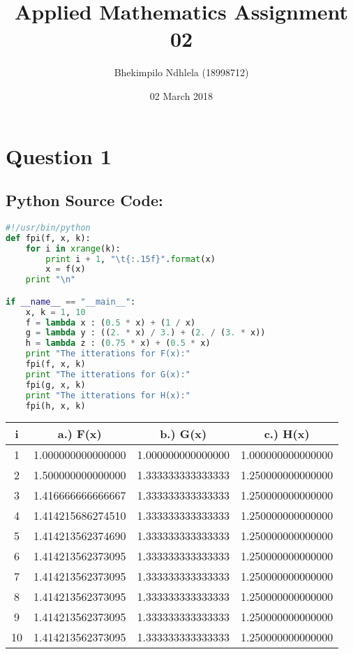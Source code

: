 \documentclass{article}
\title{Applied Mathematics Assignment 02}
\author{Bhekimpilo Ndhlela (18998712)}
\date{02 March 2018}
\begin{document}
\maketitle
\pagebreak
\section*{Question 1}
\subsection*{Python Source Code: }
\begin{lstlisting}[language=Python]
#!/usr/bin/python
def fpi(f, x, k):
    for i in xrange(k):
        print i + 1, "\t{:.15f}".format(x)
        x = f(x)
    print "\n"

if __name__ == "__main__":
    x, k = 1, 10
    f = lambda x : (0.5 * x) + (1 / x)
    g = lambda y : ((2. * x) / 3.) + (2. / (3. * x))
    h = lambda z : (0.75 * x) + (0.5 * x)
    print "The itterations for F(x):"
    fpi(f, x, k)
    print "The itterations for G(x):"
    fpi(g, x, k)
    print "The itterations for H(x):"
    fpi(h, x, k)

\end{lstlisting}


\begin{center}
    \begin{tabular}{||c c c c||} 
    \hline
    i & a.) F(x) & b.) G(x) & c.) H(x) \\ [0.5ex] 
    \hline\hline
    1 & 1.000000000000000 & 1.000000000000000 & 1.000000000000000  \\ [1ex] 
    \hline
    2 & 1.500000000000000 & 1.333333333333333 & 1.250000000000000 \\ [1ex] 
    \hline
    3 & 1.416666666666667 & 1.333333333333333 & 1.250000000000000 \\ [1ex] 
    \hline
    4 & 1.414215686274510 & 1.333333333333333 & 1.250000000000000 \\ [1ex] 
    \hline
    5 & 1.414213562374690 & 1.333333333333333 & 1.250000000000000 \\ [1ex] 
    \hline
    6 & 1.414213562373095 & 1.333333333333333 & 1.250000000000000 \\ [1ex] 
    \hline
    7 & 1.414213562373095 & 1.333333333333333 & 1.250000000000000 \\ [1ex] 
    \hline
    8 & 1.414213562373095 & 1.333333333333333 & 1.250000000000000 \\ [1ex] 
    \hline
    9 & 1.414213562373095 & 1.333333333333333 & 1.250000000000000 \\ [1ex] 
    \hline
    10 & 1.414213562373095 & 1.333333333333333 & 1.250000000000000 \\ [1ex] 
    \hline
    \end{tabular}
\end{center}
\end{document}
